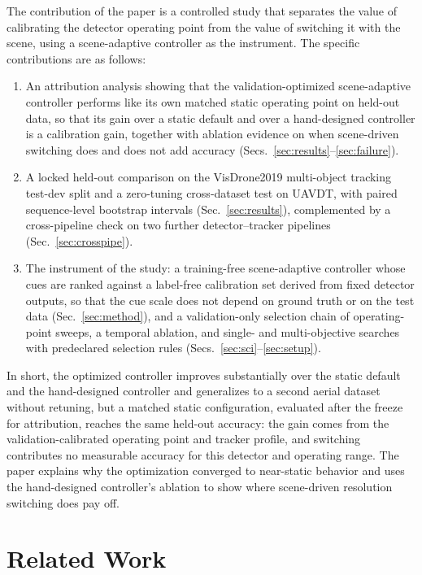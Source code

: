 \documentclass[journal]{new-aiaa}
\begin{document}
The contribution of the paper is a controlled study that separates the value of calibrating the detector operating point from the value of switching it with the scene, using a scene-adaptive controller as the instrument. The specific contributions are as follows:
\begin{enumerate}
\item An attribution analysis showing that the validation-optimized scene-adaptive controller performs like its own matched static operating point on held-out data, so that its gain over a static default and over a hand-designed controller is a calibration gain, together with ablation evidence on when scene-driven switching does and does not add accuracy (Secs.~\ref{sec:results}--\ref{sec:failure}).
\item A locked held-out comparison on the VisDrone2019 multi-object tracking test-dev split and a zero-tuning cross-dataset test on UAVDT, with paired sequence-level bootstrap intervals (Sec.~\ref{sec:results}), complemented by a cross-pipeline check on two further detector--tracker pipelines (Sec.~\ref{sec:crosspipe}).
\item The instrument of the study: a training-free scene-adaptive controller whose cues are ranked against a label-free calibration set derived from fixed detector outputs, so that the cue scale does not depend on ground truth or on the test data (Sec.~\ref{sec:method}), and a validation-only selection chain of operating-point sweeps, a temporal ablation, and single- and multi-objective searches with predeclared selection rules (Secs.~\ref{sec:sci}--\ref{sec:setup}).
\end{enumerate}

In short, the optimized controller improves substantially over the static default and the hand-designed controller and generalizes to a second aerial dataset without retuning, but a matched static configuration, evaluated after the freeze for attribution, reaches the same held-out accuracy: the gain comes from the validation-calibrated operating point and tracker profile, and switching contributes no measurable accuracy for this detector and operating range. The paper explains why the optimization converged to near-static behavior and uses the hand-designed controller's ablation to show where scene-driven resolution switching does pay off.

\section{Related Work}\label{sec:related}
\end{document}

